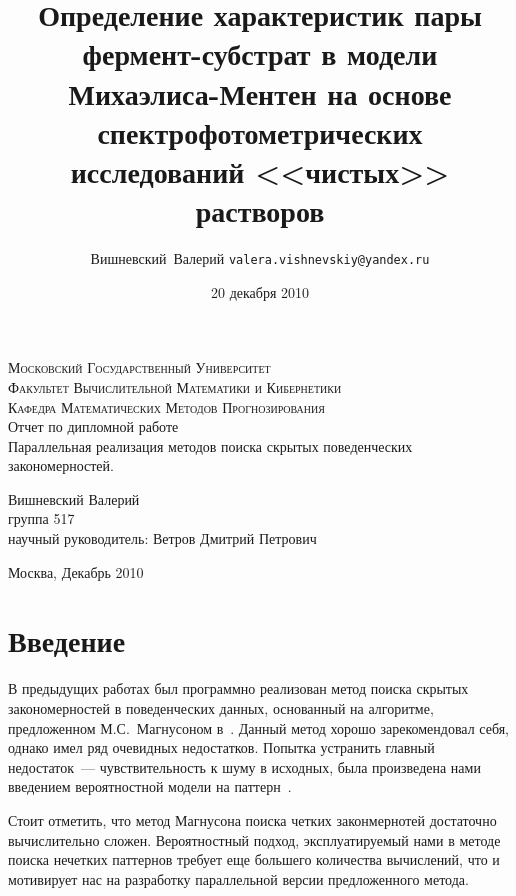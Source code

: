 \documentclass[12pt]{article}
\title{Определение характеристик пары фермент-субстрат в модели Михаэлиса-Ментен
на основе спектрофотометрических исследований <<чистых>> растворов}
\author{Вишневский~Валерий \texttt{valera.vishnevskiy@yandex.ru}}
\date{20 декабря 2010}
\begin{document}
\thispagestyle{empty}

\begin{titlepage}
  \begin{center}
  \textsc{\large{Московский Государственный Университет}
  \\[.5cm]
  \normalsize{Факультет Вычислительной Математики и Кибернетики\\
  Кафедра Математических Методов Прогнозирования}}
  \\[4cm]
 
  \large{Отчет по дипломной работе }\\[1.5cm]
 
  {\Large {Параллельная реализация методов поиска скрытых поведенческих
  закономерностей.}} \\[3cm]
  \begin{flushright}
    Вишневский Валерий\\
    группа 517\\
    научный руководитель: Ветров Дмитрий Петрович
  \end{flushright}
  \vfill
  
  Москва, Декабрь 2010
  \end{center}
 \end{titlepage}
 
\newpage


\section{Введение}
В предыдущих работах был программно реализован метод поиска скрытых 
закономерностей в поведенческих данных, основанный на алгоритме, предложенном
М.С.~Магнусоном в~\cite{Magnusson}. Данный метод хорошо зарекомендовал себя, 
однако имел ряд очевидных недостатков. Попытка устранить главный недостаток~--- 
чувствительность к шуму в исходных, была произведена нами введением 
вероятностной модели на паттерн~\cite{MB_article}.

Стоит отметить, что метод Магнусона поиска четких законмернотей 
достаточно вычислительно сложен. Вероятностный подход, эксплуатируемый нами
в методе поиска нечетких паттернов требует еще большего количества вычислений,
что и мотивирует нас на разработку параллельной версии предложенного метода.
\end{document}
